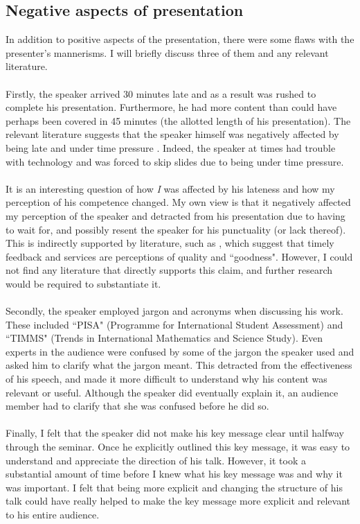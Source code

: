 \subsection{Negative aspects of presentation} \label{semRevMinus}

In addition to positive aspects of the presentation, there were some flaws with the presenter's
mannerisms.
I will briefly discuss three of them and any relevant literature.\\
\\
Firstly, the speaker arrived 30 minutes late and as a result was rushed to complete his presentation.
Furthermore, he had more content than could have perhaps been covered in 45 minutes (the allotted
length of his presentation).
The relevant literature suggests that the speaker himself was negatively affected by being late and
under time pressure \cite{DeDreu2003280,Ahituv:1998:ETP:1189478.1189487}.
Indeed, the speaker at times had trouble with technology and was forced to skip slides due to being
under time pressure.\\
\\
It is an interesting question of how {\em I} was affected by his lateness and how my perception of
his competence changed.
My own view is that it negatively affected my perception of the speaker and detracted from his
presentation due to having to wait for, and possibly resent the speaker for his punctuality (or lack
thereof).
This is indirectly supported by literature, such as \cite{weber2002author,carson1998toward}, which
suggest that timely feedback and services are perceptions of quality and ``goodness".
However, I could not find any literature that directly supports this claim, and further research
would be required to substantiate it.\\
\\
Secondly, the speaker employed jargon and acronyms when discussing his work.
These included ``PISA" (Programme for International Student Assessment) and ``TIMMS" (Trends in
International Mathematics and Science Study).
Even experts in the audience were confused by some of the jargon the speaker used and asked him to
clarify what the jargon meant.
This detracted from the effectiveness of his speech, and made it more difficult to understand why
his content was relevant or useful.
Although the speaker did eventually explain it, an audience member had to clarify that she
was confused before he did so.\\
\\
Finally, I felt that the speaker did not make his key message clear until halfway through the
seminar.
Once he explicitly outlined this key message, it was easy to understand and appreciate the direction
of his talk.
However, it took a substantial amount of time before I knew what his key message was and why it was
important.
I felt that being more explicit and changing the structure of his talk could have really helped to
make the key message more explicit and relevant to his entire audience.
